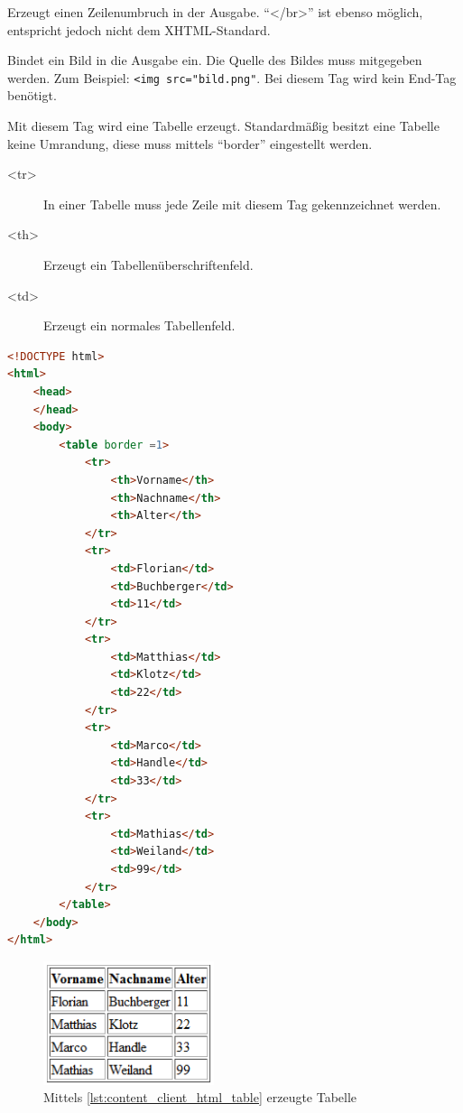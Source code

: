 \begin{description}
\begin{description} [style=nextline]
\item[<br />] Erzeugt einen Zeilenumbruch in der Ausgabe. \enquote{</br>} ist ebenso möglich, entspricht jedoch nicht dem XHTML-Standard.
\item[<img>] Bindet ein Bild in die Ausgabe ein. Die Quelle des Bildes muss mitgegeben werden. Zum Beispiel: \texttt{<img src="bild.png"}. Bei diesem Tag wird kein End-Tag benötigt.
\item[<table>] Mit diesem Tag wird eine Tabelle erzeugt. Standardmäßig besitzt eine Tabelle keine Umrandung, diese muss mittels \enquote{border} eingestellt werden.
\begin{description}
\item[<tr>] In einer Tabelle muss jede Zeile mit diesem Tag gekennzeichnet werden.
\item[<th>] Erzeugt ein Tabellenüberschriftenfeld.
\item[<td>] Erzeugt ein normales Tabellenfeld.
\end{description}
\end{description}
\end{description}
\begin{lstlisting}[style=custom, language=HTML, caption={HTML-Tabelle}, label={lst:content_client_html_table}]
<!DOCTYPE html>
<html>
	<head>
	</head>
	<body>
		<table border =1> 
			<tr>
				<th>Vorname</th>
				<th>Nachname</th>
				<th>Alter</th>
			</tr>
			<tr>
				<td>Florian</td>
				<td>Buchberger</td>
				<td>11</td>
			</tr>
			<tr>
				<td>Matthias</td>
				<td>Klotz</td>
				<td>22</td>
			</tr>
			<tr>
				<td>Marco</td>
				<td>Handle</td>
				<td>33</td>
			</tr>
			<tr>
				<td>Mathias</td>
				<td>Weiland</td>
				<td>99</td>
			</tr>
		</table>
	</body>
</html>
\end{lstlisting}

\begin{figure}[H]
\centering
\includegraphics[keepaspectratio=true, width=5cm]{images/screenshots/html_table.png}
\caption{Mittels \autoref{lst:content_client_html_table} erzeugte Tabelle}
\label{fig:content_html_table}
\end{figure}

